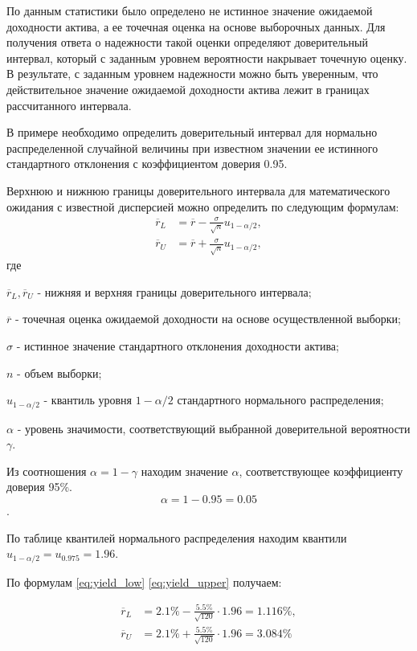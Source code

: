 \documentclass[12pt, table, twoside, a4paper]{exam}
\begin{document}
\begin{questions}
\begin{solution}[8em]
	\raggedright
	По данным статистики было определено не истинное значение ожидаемой доходности актива, а ее точечная оценка на основе выборочных данных. Для получения ответа о надежности такой оценки определяют доверительный интервал, который с заданным уровнем вероятности накрывает точечную оценку. В результате, с заданным уровнем надежности можно быть уверенным, что действительное значение ожидаемой доходности актива лежит в границах рассчитанного интервала.
	
	В примере необходимо определить доверительный интервал для нормально распределенной случайной величины при известном значении ее истинного стандартного отклонения с коэффициентом доверия 0.95.
	
	Верхнюю и нижнюю границы доверительного интервала для математического ожидания с известной дисперсией можно определить по следующим формулам:
	\begin{align}
	\label{eq:yield_low}
	\overline{r}_L &=\overline{r}-\frac{\sigma}{\sqrt{n}}u_{1-\alpha/2},\\[8pt]
	\label{eq:yield_upper}
	\overline{r}_U &=\overline{r}+\frac{\sigma}{\sqrt{n}}u_{1-\alpha/2},
	\end{align}
	где
	
	$\overline{r}_L, \overline{r}_U$ - нижняя и верхняя  границы доверительного интервала;
	
	$\overline{r}$ - точечная оценка ожидаемой доходности на основе осуществленной выборки;
	
	$\sigma$ - истинное значение стандартного отклонения доходности актива;
	
	$n$ - объем выборки;
	
	$u_{1-\alpha/2}$ - квантиль уровня $1-\alpha/2$ стандартного нормального распределения;
	
	$\alpha$ - уровень значимости, соответствующий выбранной доверительной вероятности $\gamma$.
	
	Из соотношения $\alpha=1-\gamma$ находим значение $\alpha$, соответствующее коэффициенту доверия 95\%.
	$$\alpha=1-0.95=0.05$$.
	
	По таблице квантилей нормального распределения находим квантили $u_{1-\alpha/2}=u_{0.975}=1.96$.
	
	По формулам \eqref{eq:yield_low} \eqref{eq:yield_upper} получаем:

	\begin{align*}
	\overline{r}_L&=2.1\% - \frac{5.5\%}{\sqrt{120}} \cdot 1.96
	= 1.116\%, \\
	\overline{r}_U&=2.1\% + \frac{5.5\%}{\sqrt{120}} \cdot 1.96 =3.084\%
	\end{align*}
		

\end{solution}
\end{questions}
\end{document}
